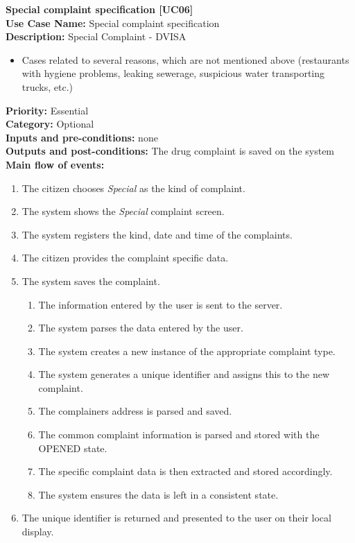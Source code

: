 \documentclass[11pt,twoside]{article}
\begin{document}
\textbf{Special complaint specification [UC06]}\\
\textbf{Use Case Name:} Special complaint specification \\
\textbf{Description:} Special Complaint - DVISA
\begin{itemize}
 \item Cases related to several reasons, which are not mentioned above
(restaurants with hygiene problems, leaking sewerage, suspicious
water transporting trucks, etc.)
\end{itemize}
\textbf{Priority:} Essential\\
\textbf{Category:} Optional\\
\textbf{Inputs and pre-conditions:} none\\
\textbf{Outputs and post-conditions:}  The drug complaint is saved on the system\\
\textbf{Main flow of events:}\\
\begin{enumerate}
\item The citizen chooses \textit{Special} as the kind of complaint.
\item The system shows the \textit{Special} complaint screen.
\item The system registers the kind, date and time of the complaints.
\item The citizen provides the complaint specific data.
\item The system saves the complaint.
\begin{enumerate}
\item The information entered by the user is sent to the server.
\item The system parses the data entered by the user.
\item The system creates a new instance of the appropriate complaint
type.
\item The system generates a unique identifier and assigns this to the new
complaint.
\item The complainers address is parsed and saved.
\item The common complaint information is parsed and stored with the
OPENED state.
\item The specific complaint data is then extracted and stored accordingly.
\item The system ensures the data is left in a consistent state.
\end{enumerate}
\item The unique identifier is returned and presented to the user on their local
display.\end{enumerate}
\end{document}
